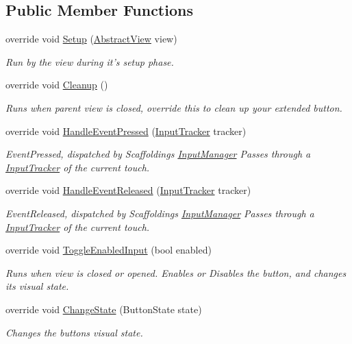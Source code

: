 \subsection*{Public Member Functions}
\begin{DoxyCompactItemize}
\item 
override void \hyperlink{class_scaffolding_1_1_scaffolding_button_a9473252a76f28a9d9605c7be23377f94}{Setup} (\hyperlink{class_scaffolding_1_1_abstract_view}{Abstract\+View} view)
\begin{DoxyCompactList}\small\item\em Run by the view during it's setup phase. \end{DoxyCompactList}\item 
override void \hyperlink{class_scaffolding_1_1_scaffolding_button_a1f295926babd2653cd63ed2933108d45}{Cleanup} ()
\begin{DoxyCompactList}\small\item\em Runs when parent view is closed, override this to clean up your extended button. \end{DoxyCompactList}\item 
override void \hyperlink{class_scaffolding_1_1_scaffolding_button_a1cc1e5b6b74c5411e1ca46dd81eb5144}{Handle\+Event\+Pressed} (\hyperlink{class_scaffolding_1_1_input_tracker}{Input\+Tracker} tracker)
\begin{DoxyCompactList}\small\item\em Event\+Pressed, dispatched by Scaffoldings \hyperlink{class_scaffolding_1_1_input_manager}{Input\+Manager} Passes through a \hyperlink{class_scaffolding_1_1_input_tracker}{Input\+Tracker} of the current touch. \end{DoxyCompactList}\item 
override void \hyperlink{class_scaffolding_1_1_scaffolding_button_ab6c3c337fc6c6c9dad69498ac5acd098}{Handle\+Event\+Released} (\hyperlink{class_scaffolding_1_1_input_tracker}{Input\+Tracker} tracker)
\begin{DoxyCompactList}\small\item\em Event\+Released, dispatched by Scaffoldings \hyperlink{class_scaffolding_1_1_input_manager}{Input\+Manager} Passes through a \hyperlink{class_scaffolding_1_1_input_tracker}{Input\+Tracker} of the current touch. \end{DoxyCompactList}\item 
override void \hyperlink{class_scaffolding_1_1_scaffolding_button_aa84a30d26afd5a3f54b5614d6e09e535}{Toggle\+Enabled\+Input} (bool enabled)
\begin{DoxyCompactList}\small\item\em Runs when view is closed or opened. Enables or Disables the button, and changes its visual state. \end{DoxyCompactList}\item 
override void \hyperlink{class_scaffolding_1_1_scaffolding_button_a854f1852fba9c84f9270ab9f7dde3653}{Change\+State} (Button\+State state)
\begin{DoxyCompactList}\small\item\em Changes the buttons visual state. \end{DoxyCompactList}\end{DoxyCompactItemize}
